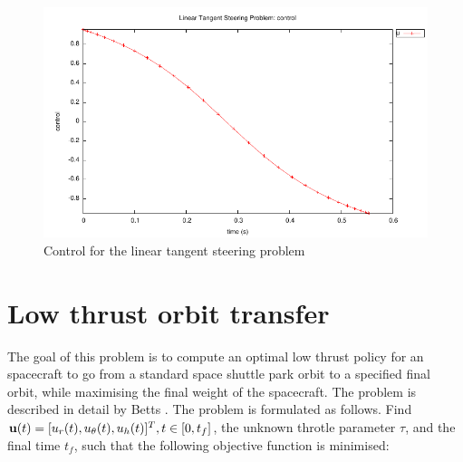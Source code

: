 \documentclass[a4paper,11pt]{report}    %
\newcommand{\mt}[1]{\ensuremath \mathbf{#1}}
\begin{document}
\begin{figure}
  \centering
  \includegraphics{../examples/lts/lts_control}
  \caption{Control for the linear tangent steering problem}
 \label{fig:lts_control}
\end{figure}



\section{Low thrust orbit transfer}
\label{sec:ltot}

The goal of this problem is to compute an optimal low thrust policy for an spacecraft to go
from a standard space shuttle park orbit to a specified final orbit, while maximising the final 
weight of the spacecraft. The problem is described in detail by Betts \cite{Betts:01}. The problem
is formulated as follows. Find $\mt{u}(t) = [ u_r(t), u_{\theta}(t), u_h(t) ]^T, t \in [0, t_f]$,  
the unknown throtle parameter $\tau$, and the final time $t_f$, such that the following objective
function is minimised:
\end{document}

